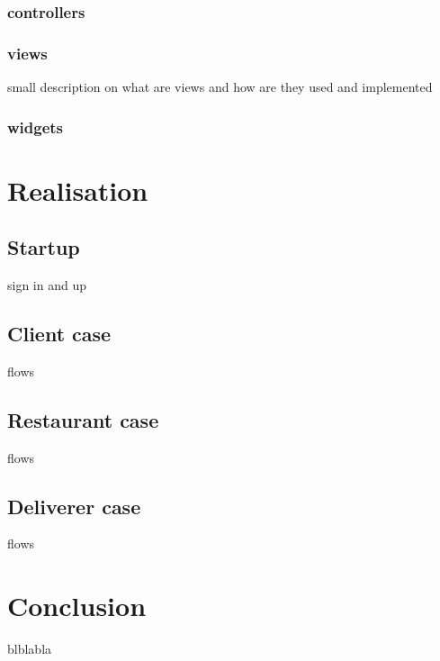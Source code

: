 \documentclass[a4paper, 10p]{report}
\begin{document}
		\subsection{controllers}
		\subsection{views}
		small description on what are views and how are they used and implemented
		\subsection{widgets}
		
\newpage
\chapter{Realisation}
	\section{Startup} sign in and up
	\section{Client case} flows
	\section{Restaurant case} flows
	\section{Deliverer case} flows

\newpage
\chapter*{Conclusion}
blblabla

\newpage
\begin{thebibliography}{300}
\end{thebibliography}
\end{document}
